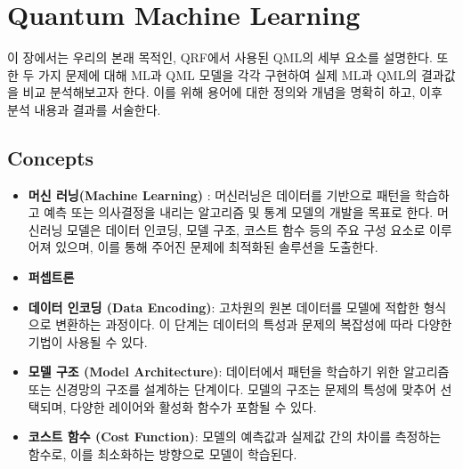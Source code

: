 
\section{Quantum Machine Learning}
 이 장에서는 우리의 본래 목적인, QRF에서 사용된 QML의 세부 요소를 설명한다. 또한 두 가지 문제에 대해 ML과 QML 모델을 각각 구현하여 실제 ML과 QML의 결과값을 비교 분석해보고자 한다. 이를 위해 용어에 대한 정의와 개념을 명확히 하고, 이후 분석 내용과 결과를 서술한다.

\subsection{Concepts}
\begin{itemize}
    \item \textbf{머신 러닝(Machine Learning)} : 머신러닝은 데이터를 기반으로 패턴을 학습하고 예측 또는 의사결정을 내리는 알고리즘 및 통계 모델의 개발을 목표로 한다. 머신러닝 모델은 데이터 인코딩, 모델 구조, 코스트 함수 등의 주요 구성 요소로 이루어져 있으며, 이를 통해 주어진 문제에 최적화된 솔루션을 도출한다.

    \item \textbf{퍼셉트론}

    \item \textbf{데이터 인코딩 (Data Encoding)}: 고차원의 원본 데이터를 모델에 적합한 형식으로 변환하는 과정이다. 이 단계는 데이터의 특성과 문제의 복잡성에 따라 다양한 기법이 사용될 수 있다.

    \item \textbf{모델 구조 (Model Architecture)}: 데이터에서 패턴을 학습하기 위한 알고리즘 또는 신경망의 구조를 설계하는 단계이다. 모델의 구조는 문제의 특성에 맞추어 선택되며, 다양한 레이어와 활성화 함수가 포함될 수 있다.

    \item \textbf{코스트 함수 (Cost Function)}: 모델의 예측값과 실제값 간의 차이를 측정하는 함수로, 이를 최소화하는 방향으로 모델이 학습된다.
\end{itemize}

